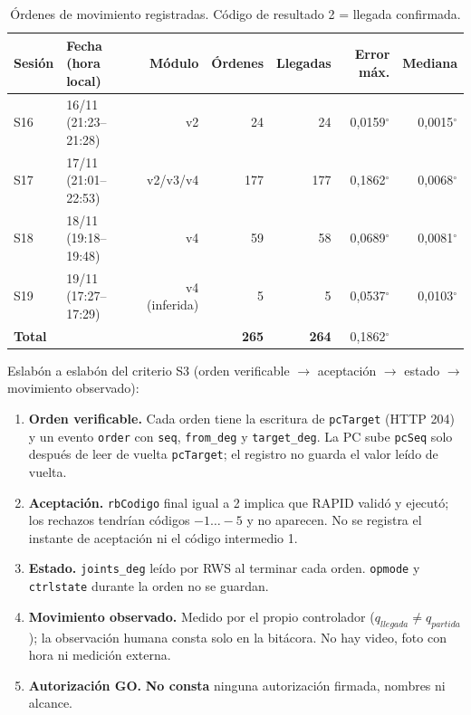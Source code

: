 \documentclass[10pt,a4paper]{article}
\begin{document}
\begin{table}[H]
\centering\small
\renewcommand{\arraystretch}{1.15}
\begin{tabular}{@{}llrrrrr@{}}
\toprule
\textbf{Sesión} & \textbf{Fecha (hora local)} & \textbf{Módulo} & \textbf{Órdenes} & \textbf{Llegadas} & \textbf{Error máx.} & \textbf{Mediana}\\
\midrule
S16 & 16/11 (21:23--21:28) & v2 & 24 & 24 & 0,0159$^\circ$ & 0,0015$^\circ$\\
S17 & 17/11 (21:01--22:53) & v2/v3/v4 & 177 & 177 & 0,1862$^\circ$ & 0,0068$^\circ$\\
S18 & 18/11 (19:18--19:48) & v4 & 59 & 58 & 0,0689$^\circ$ & 0,0081$^\circ$\\
S19 & 19/11 (17:27--17:29) & v4 (inferida) & 5 & 5 & 0,0537$^\circ$ & 0,0103$^\circ$\\
\midrule
\textbf{Total} & & & \textbf{265} & \textbf{264} & 0,1862$^\circ$ & \\
\bottomrule
\end{tabular}
\caption{Órdenes de movimiento registradas. Código de resultado 2 = llegada confirmada.}
\end{table}

Eslabón a eslabón del criterio S3 (orden verificable $\to$ aceptación $\to$ estado $\to$ movimiento observado):
\begin{enumerate}[leftmargin=*]
\item \textbf{Orden verificable.} Cada orden tiene la escritura de \texttt{pcTarget} (HTTP 204) y un evento \texttt{order} con \texttt{seq}, \texttt{from\_deg} y \texttt{target\_deg}. La PC sube \texttt{pcSeq} solo después de leer de vuelta \texttt{pcTarget}; el registro no guarda el valor leído de vuelta.
\item \textbf{Aceptación.} \texttt{rbCodigo} final igual a 2 implica que RAPID validó y ejecutó; los rechazos tendrían códigos $-1\dots-5$ y no aparecen. No se registra el instante de aceptación ni el código intermedio 1.
\item \textbf{Estado.} \texttt{joints\_deg} leído por RWS al terminar cada orden. \texttt{opmode} y \texttt{ctrlstate} durante la orden no se guardan.
\item \textbf{Movimiento observado.} Medido por el propio controlador ($q_{llegada}\neq q_{partida}$); la observación humana consta solo en la bitácora. No hay video, foto con hora ni medición externa.
\item \textbf{Autorización GO.} \textbf{No consta} ninguna autorización firmada, nombres ni alcance.
\end{enumerate}
\end{document}
